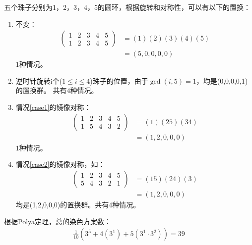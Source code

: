 \begin{solution}
    五个珠子分别为1，2，3，4，5的圆环，根据旋转和对称性，可以有以下的置换：
    \begin{enumerate}
        \item 不变：\label{case1}
        \begin{align*}
            \left(
               \begin{matrix}
                  1 & 2 & 3 & 4 & 5\\
                  1 & 2 & 3 & 4 & 5
               \end{matrix}
               \right) &= (1)(2)(3)(4)(5) \\
               &= (5,0,0,0,0)
         \end{align*}
         $1$种情况。
        \item 逆时针旋转i个($1\le i\le 4$)珠子的位置，由于$\gcd(i,5)=1$，均是(0,0,0,0,1)的置换群。
        共有$4$种情况。\label{case2}
        \item 情况\ref{case1}的镜像对称：\label{case3}
        \begin{align*}
            \left(
               \begin{matrix}
                  1 & 2 & 3 & 4 & 5\\
                  1 & 5 & 4 & 3 & 2
               \end{matrix}
               \right) &= (1)(25)(34) \\
               &= (1,2,0,0,0)
         \end{align*}
         $1$种情况。
        \item 情况\ref{case2}的镜像对称，如：
        \begin{align*}
            \left(
               \begin{matrix}
                  1 & 2 & 3 & 4 & 5\\
                  5 & 4 & 3 & 2 & 1
               \end{matrix}
               \right) &= (15)(24)(3) \\
               &= (1,2,0,0,0)
         \end{align*}
         均是(1,2,0,0,0)的置换群。共有$4$种情况。
    \end{enumerate}
    根据Polya定理，总的染色方案数：
    \begin{align*}
        \frac{1}{10}\left(3^5+4(3^1)+5(3^1\cdot 3^2)\right) = 39
    \end{align*}
\end{solution}
